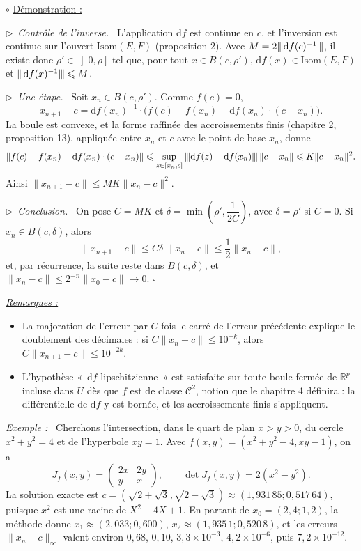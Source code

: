 \documentclass[a4paper,twoside]{report}
\newenvironment{demo}%
 {\par\needspace{4\baselineskip}\vspace{1mm}\noindent$\circ$ \underline{Démonstration :}~\setlength{\parskip}{3pt plus 1pt}}%
 {\hfill$\square$\par\vspace{2mm}}
\newcommand{\etape}[1]{\par\smallskip\noindent$\triangleright$~\textit{#1}~}
\newenvironment{exemple}%
 {\par\needspace{6\baselineskip}\vspace{1mm}\begin{list}{}{\leftmargin=1cm \rightmargin=0.5cm}\item[]%
  \textit{Exemple :}~}%
 {\end{list}\vspace{1mm}}
\newenvironment{remarques}%
 {\par\needspace{6\baselineskip}\vspace{1mm}\begin{list}{}{\leftmargin=1cm \rightmargin=0.5cm}\item[]%
  \textit{\underline{Remarques :}}%
  \begin{itemize}[label=$\bullet$,leftmargin=0.45cm,topsep=3pt,itemsep=4pt]}%
 {\end{itemize}\end{list}\vspace{1mm}}
\newcommand{\R}{\mathbb{R}}
\newcommand{\dd}{\mathrm{d}}                      %
\newcommand{\norme}[1]{\lVert #1 \rVert}         %
\newcommand{\nop}[1]{|\mkern-1.5mu|\mkern-1.5mu|#1|\mkern-1.5mu|\mkern-1.5mu|}   %
\newcommand{\Bo}{B}                               %
\newcommand{\Cc}{\mathcal{C}}                     %
\newcommand{\Isom}{\mathrm{Isom}}                 %
\newcommand{\Jac}{J}                              %
\begin{document}
\begin{demo}
\etape{Contrôle de l'inverse.} L'application $\dd f$ est continue en $c$, et l'inversion est continue sur l'ouvert $\Isom(E, F)$ (proposition 2). Avec $M = 2\nop{\dd f(c)^{-1}}$, il existe donc $\rho' \in \left]0, \rho\right]$ tel que, pour tout $x \in \Bo(c, \rho')$, $\dd f(x) \in \Isom(E, F)$ et $\nop{\dd f(x)^{-1}} \leqslant M$.

\etape{Une étape.} Soit $x_{n} \in \Bo(c, \rho')$. Comme $f(c) = 0$,
\[ x_{n + 1} - c = \dd f(x_{n})^{-1}\cdot\big(f(c) - f(x_{n}) - \dd f(x_{n})\cdot(c - x_{n})\big). \]
La boule est convexe, et la forme raffinée des accroissements finis (chapitre 2, proposition 13), appliquée entre $x_{n}$ et $c$ avec le point de base $x_{n}$, donne
\[ \norme{f(c) - f(x_{n}) - \dd f(x_{n})\cdot(c - x_{n})} \leqslant \sup_{z \in [x_{n}, c]} \nop{\dd f(z) - \dd f(x_{n})}\,\norme{c - x_{n}} \leqslant K\norme{c - x_{n}}^{2}. \]
Ainsi $\norme{x_{n + 1} - c} \leqslant MK\norme{x_{n} - c}^{2}$.

\etape{Conclusion.} On pose $C = MK$ et $\delta = \min\left(\rho', \dfrac{1}{2C}\right)$, avec $\delta = \rho'$ si $C = 0$. Si $x_{n} \in \Bo(c, \delta)$, alors
\[ \norme{x_{n + 1} - c} \leqslant C\delta\,\norme{x_{n} - c} \leqslant \frac{1}{2}\norme{x_{n} - c}, \]
et, par récurrence, la suite reste dans $\Bo(c, \delta)$, et $\norme{x_{n} - c} \leqslant 2^{-n}\norme{x_{0} - c} \to 0$.
\end{demo}

\begin{remarques}
  \item La majoration de l'erreur par $C$ fois le carré de l'erreur précédente explique le doublement des décimales : si $C\norme{x_{n} - c} \leqslant 10^{-k}$, alors $C\norme{x_{n + 1} - c} \leqslant 10^{-2k}$.
  \item L'hypothèse «~$\dd f$ lipschitzienne~» est satisfaite sur toute boule fermée de $\R^{p}$ incluse dans $U$ dès que $f$ est de classe $\Cc^{2}$, notion que le chapitre 4 définira : la différentielle de $\dd f$ y est bornée, et les accroissements finis s'appliquent.
\end{remarques}

\begin{exemple}
Cherchons l'intersection, dans le quart de plan $x > y > 0$, du cercle $x^{2} + y^{2} = 4$ et de l'hyperbole $xy = 1$. Avec $f(x, y) = (x^{2} + y^{2} - 4, xy - 1)$, on a
\[ \Jac_{f}(x, y) = \begin{pmatrix} 2x & 2y \\ y & x \end{pmatrix}, \qquad \det \Jac_{f}(x, y) = 2(x^{2} - y^{2}). \]
La solution exacte est $c = \left(\sqrt{2 + \sqrt{3}}, \sqrt{2 - \sqrt{3}}\right) \approx (1{,}931\,85 ; 0{,}517\,64)$, puisque $x^{2}$ est une racine de $X^{2} - 4X + 1$. En partant de $x_{0} = (2{,}4 ; 1{,}2)$, la méthode donne $x_{1} \approx (2{,}033 ; 0{,}600)$, $x_{2} \approx (1{,}935\,1 ; 0{,}520\,8)$, et les erreurs $\norme{x_{n} - c}_{\infty}$ valent environ $0{,}68$, $0{,}10$, $3{,}3 \times 10^{-3}$, $4{,}2 \times 10^{-6}$, puis $7{,}2 \times 10^{-12}$.
\end{exemple}
\end{document}
